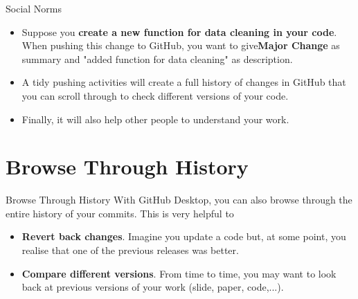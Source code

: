 \documentclass[aspectratio=169]{beamer}
\begin{document}
\begin{frame}{Social Norms}
	\begin{itemize}\setlength\itemsep{2.5em}
		\item Suppose you \textbf{create a new function for data cleaning in your code}. When pushing this change to GitHub, you want to give\textbf{Major Change} as summary and "added function for data cleaning" as description.
		\item A tidy pushing activities will create a full history of changes in GitHub that you can scroll through to check different versions of your code.
		\item Finally, it will also help other people to understand your work.
	\end{itemize}
\end{frame}

\section{Browse Through History}

\begin{frame}{Browse Through History}
	With GitHub Desktop, you can also browse through the entire history of your commits. This is very helpful to \vspace{1cm}
		\begin{itemize}\setlength\itemsep{2.5em}
		\item \textbf{Revert back changes}. Imagine you update a code but, at some point, you realise that one of the previous releases was better. 
		\item \textbf{Compare different versions}. From time to time, you may want to look back at previous versions of your work (slide, paper, code,...).
	\end{itemize}
\end{frame}
\end{document}
